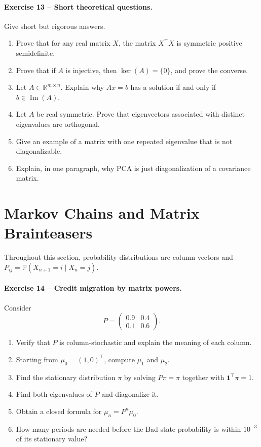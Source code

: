 \documentclass[10pt]{article}
\newcommand{\R}{\mathbb{R}}
\newcommand{\im}{\operatorname{Im}}
\begin{document}
\paragraph{Exercise 13 -- Short theoretical questions.}
Give short but rigorous answers.

\begin{enumerate}
\item Prove that for any real matrix $X$, the matrix $X^\top X$ is symmetric
positive semidefinite.
\item Prove that if $A$ is injective, then $\ker(A)=\{0\}$, and prove the
converse.
\item Let $A\in\R^{m\times n}$. Explain why $Ax=b$ has a solution if and only
if $b\in\im(A)$.
\item Let $A$ be real symmetric. Prove that eigenvectors associated with
distinct eigenvalues are orthogonal.
\item Give an example of a matrix with one repeated eigenvalue that is not
diagonalizable.
\item Explain, in one paragraph, why PCA is just diagonalization of a covariance
matrix.
\end{enumerate}

\section{Markov Chains and Matrix Brainteasers}

Throughout this section, probability distributions are column vectors and
$P_{ij}=\mathbb{P}(X_{n+1}=i\mid X_n=j)$.

\paragraph{Exercise 14 -- Credit migration by matrix powers.}
Consider
\[
P=\begin{pmatrix}0.9&0.4\\0.1&0.6\end{pmatrix}.
\]

\begin{enumerate}
\item Verify that $P$ is column-stochastic and explain the meaning of each
column.
\item Starting from $\mu_0=(1,0)^\top$, compute $\mu_1$ and $\mu_2$.
\item Find the stationary distribution $\pi$ by solving
$P\pi=\pi$ together with $\mathbf{1}^\top\pi=1$.
\item Find both eigenvalues of $P$ and diagonalize it.
\item Obtain a closed formula for $\mu_n=P^n\mu_0$.
\item How many periods are needed before the Bad-state probability is within
$10^{-3}$ of its stationary value?
\end{enumerate}
\end{document}
